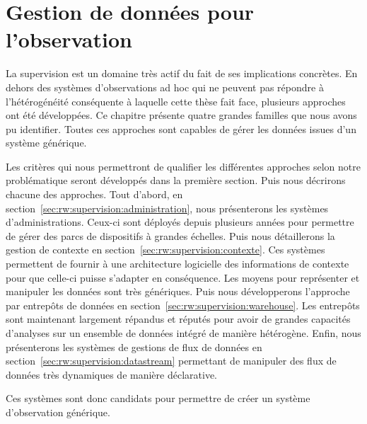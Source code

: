 \chapter{Gestion de données pour l'observation}\label{chap:rw:supervision}
\minitoc

La supervision est un domaine très actif du fait de ses implications concrètes. En dehors des systèmes d'observations ad hoc qui ne peuvent pas répondre à l'hétérogénéité conséquente à laquelle cette thèse fait face, plusieurs approches ont été développées. Ce chapitre présente quatre grandes familles que nous avons pu identifier. Toutes ces approches sont capables de gérer les données issues d'un système générique.

Les critères qui nous permettront de qualifier les différentes approches selon notre problématique seront développés dans la première section. Puis nous décrirons chacune des approches. Tout d'abord, en section~\ref{sec:rw:supervision:administration}, nous présenterons les systèmes d'administrations. Ceux-ci sont déployés depuis plusieurs années pour permettre de gérer des parcs de dispositifs à grandes échelles. Puis nous détaillerons la gestion de contexte en section~\ref{sec:rw:supervision:contexte}. Ces systèmes permettent de fournir à une architecture logicielle des informations de contexte pour que celle-ci puisse s'adapter en conséquence. Les moyens pour représenter et manipuler les données sont très génériques. Puis nous développerons l'approche par entrepôts de données en section~\ref{sec:rw:supervision:warehouse}. Les entrepôts sont maintenant largement répandus et réputés pour avoir de grandes capacités d'analyses sur un ensemble de données intégré de manière hétérogène. Enfin, nous présenterons les systèmes de gestions de flux de données en section~\ref{sec:rw:supervision:datastream} permettant de manipuler des flux de données très dynamiques de manière déclarative.

Ces systèmes sont donc candidats pour permettre de créer un système d'observation générique.








